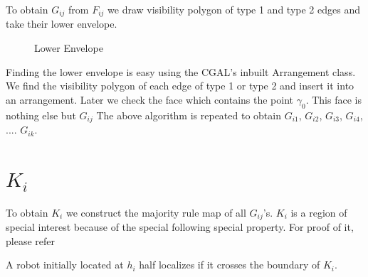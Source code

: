 To obtain $G_{ij}$ from $F_{ij}$ we draw visibility polygon of type 1 and type 2 edges and take their lower envelope.

\begin{figure}[h]
\begin{center}
\caption{\label{fig:Construction}Lower Envelope}
\end{center}
\end{figure}

Finding the lower envelope is easy using the CGAL's inbuilt Arrangement class. We find the visibility polygon of each edge of type 1
or type 2 and insert it into an arrangement. Later we check the face which contains the point $\gamma_{0}$. This face is nothing else
but $G_{ij}$
The above algorithm is repeated to obtain $G_{i1}$, $G_{i2}$, $G_{i3}$, $G_{i4}$, .... $G_{ik}$.


\section{$K_{i}$}
 To obtain $K_{i}$ we construct the 
majority rule map of all $G_{ij}$'s. $K_{i}$ is a region of special interest because of the special following special property. For 
proof of it, please refer \cite{key1}
\begin{remark} 
 A robot initially located at $h_{i}$ half localizes if it crosses the boundary of $K_{i}$.
\end{remark}




